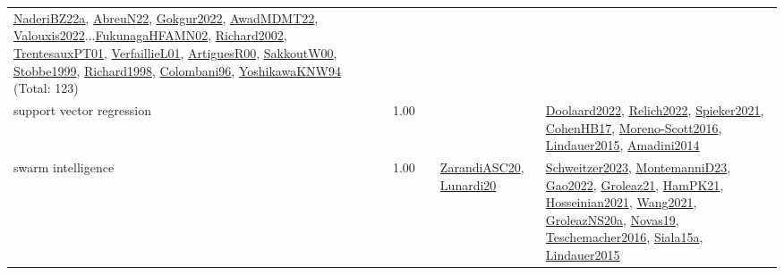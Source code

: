 {\begin{longtable}{p{3cm}r>{\raggedright\arraybackslash}p{6cm}>{\raggedright\arraybackslash}p{6cm}>{\raggedright\arraybackslash}p{8cm}}
\hyperref[detail:NaderiBZ22a]{NaderiBZ22a}, \hyperref[detail:AbreuN22]{AbreuN22}, \hyperref[detail:Gokgur2022]{Gokgur2022}, \hyperref[detail:AwadMDMT22]{AwadMDMT22}, \hyperref[detail:Valouxis2022]{Valouxis2022}...\hyperref[detail:FukunagaHFAMN02]{FukunagaHFAMN02}, \hyperref[detail:Richard2002]{Richard2002}, \hyperref[detail:TrentesauxPT01]{TrentesauxPT01}, \hyperref[detail:VerfaillieL01]{VerfaillieL01}, \hyperref[detail:ArtiguesR00]{ArtiguesR00}, \hyperref[detail:SakkoutW00]{SakkoutW00}, \hyperref[detail:Stobbe1999]{Stobbe1999}, \hyperref[detail:Richard1998]{Richard1998}, \hyperref[detail:Colombani96]{Colombani96}, \hyperref[detail:YoshikawaKNW94]{YoshikawaKNW94} (Total: 123)\\
\index{support vector regression}\index{Algorithms!support vector regression}support vector regression &  1.00 &  &  & \hyperref[detail:Doolaard2022]{Doolaard2022}, \hyperref[detail:Relich2022]{Relich2022}, \hyperref[detail:Spieker2021]{Spieker2021}, \hyperref[detail:CohenHB17]{CohenHB17}, \hyperref[detail:Moreno-Scott2016]{Moreno-Scott2016}, \hyperref[detail:Lindauer2015]{Lindauer2015}, \hyperref[detail:Amadini2014]{Amadini2014}\\
\index{swarm intelligence}\index{Algorithms!swarm intelligence}swarm intelligence &  1.00 &  & \hyperref[detail:ZarandiASC20]{ZarandiASC20}, \hyperref[detail:Lunardi20]{Lunardi20} & \hyperref[detail:Schweitzer2023]{Schweitzer2023}, \hyperref[detail:MontemanniD23]{MontemanniD23}, \hyperref[detail:Gao2022]{Gao2022}, \hyperref[detail:Groleaz21]{Groleaz21}, \hyperref[detail:HamPK21]{HamPK21}, \hyperref[detail:Hosseinian2021]{Hosseinian2021}, \hyperref[detail:Wang2021]{Wang2021}, \hyperref[detail:GroleazNS20a]{GroleazNS20a}, \hyperref[detail:Novas19]{Novas19}, \hyperref[detail:Teschemacher2016]{Teschemacher2016}, \hyperref[detail:Siala15a]{Siala15a}, \hyperref[detail:Lindauer2015]{Lindauer2015}\\

\end{longtable}}
